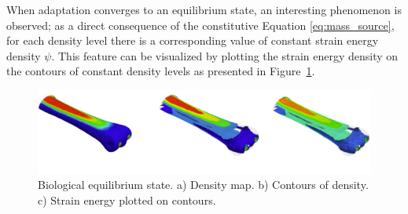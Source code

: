 \documentclass[11pt]{ACMEarticle}
\numberwithin{equation}{section}
\begin{document}
When adaptation converges to an equilibrium state, an interesting phenomenon is observed; as a direct consequence of the constitutive Equation \ref{eq:mass_source}, for each density level there is a corresponding value of constant strain energy density $\psi$. This feature can be visualized by plotting the strain energy density on the contours of constant density levels as presented in Figure~\ref{fig:mc3_biol_eq}. 
\begin{figure}[h!]
	\begin{centering}
		\includegraphics[width=12cm]{Figures/mc3_biol_eq}
		\caption{Biological equilibrium state. a) Density map. b) Contours of density. c) Strain energy plotted on contours.}
		\label{fig:mc3_biol_eq}
	\end{centering}
\end{figure}
\end{document}
